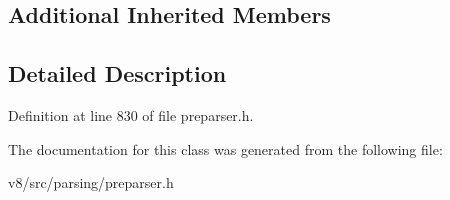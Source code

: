 \subsection*{Additional Inherited Members}


\subsection{Detailed Description}


Definition at line 830 of file preparser.\+h.



The documentation for this class was generated from the following file\+:\begin{DoxyCompactItemize}
\item 
v8/src/parsing/preparser.\+h\end{DoxyCompactItemize}
